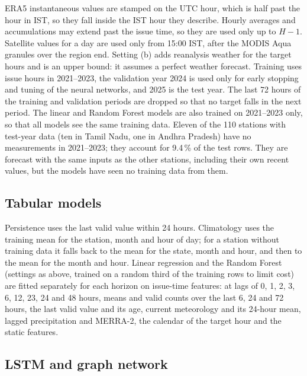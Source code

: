 ERA5 instantaneous values are stamped on the UTC hour, which is half past the hour in IST, so they
fall inside the IST hour they describe. Hourly averages and accumulations may extend past the issue
time, so they are used only up to $H-1$. Satellite values for a day are used only from 15:00 IST,
after the MODIS Aqua granules over the region end. Setting (b) adds reanalysis weather for the
target hours and is an upper bound: it assumes a perfect weather forecast. Training uses issue
hours in 2021--2023, the validation year 2024 is used only for early stopping and tuning of the
neural networks, and 2025 is the test year. The last 72 hours of the training and validation
periods are dropped so that no target falls in the next period. The linear and Random Forest models
are also trained on 2021--2023 only, so that all models see the same training data. Eleven of the
110 stations with test-year data (ten in Tamil Nadu, one in Andhra Pradesh) have no measurements in
2021--2023; they account for 9.4\,\% of the test rows. They are forecast with the same inputs as the
other stations, including their own recent values, but the models have seen no training data from
them.

\subsection{Tabular models}

Persistence uses the last valid value within 24 hours. Climatology uses the training mean for the
station, month and hour of day; for a station without training data it falls back to the mean for
the state, month and hour, and then to the mean for the month and hour. Linear regression and the Random Forest (settings as above, trained
on a random third of the training rows to limit cost) are fitted separately for each horizon on
issue-time features: \pmtf{} at lags of 0, 1, 2, 3, 6, 12, 23, 24 and 48 hours, means and valid
counts over the last 6, 24 and 72 hours, the last valid value and its age, current meteorology and
its 24-hour mean, lagged precipitation and MERRA-2, the calendar of the target hour and the static
features.

\subsection{LSTM and graph network}

